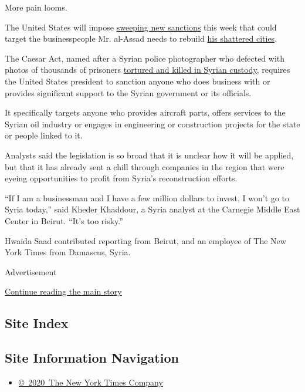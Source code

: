 More pain looms.

The United States will impose
\href{https://www.nytimes.com/2019/12/16/us/politics/us-syria-sanctions-war-crimes.html}{sweeping
new sanctions} this week that could target the businesspeople Mr.
al-Assad needs to rebuild
\href{https://www.nytimes.com/2019/08/20/world/middleeast/syria-recovery-aleppo-douma.html}{his
shattered cities}.

The Caesar Act, named after a Syrian police photographer who defected
with photos of thousands of prisoners
\href{https://www.nytimes.com/2019/05/11/world/middleeast/syria-torture-prisons.html}{tortured
and killed in Syrian custody}, requires the United States president to
sanction anyone who does business with or provides significant support
to the Syrian government or its officials.

It specifically targets anyone who provides aircraft parts, offers
services to the Syrian oil industry or engages in engineering or
construction projects for the state or people linked to it.

Analysts said the legislation is so broad that it is unclear how it will
be applied, but that it has already sent a chill through companies in
the region that were eyeing opportunities to profit from Syria's
reconstruction efforts.

``If I am a businessman and I have a few million dollars to invest, I
won't go to Syria today,'' said Kheder Khaddour, a Syria analyst at the
Carnegie Middle East Center in Beirut. ``It's too risky.''

Hwaida Saad contributed reporting from Beirut, and an employee of The
New York Times from Damascus, Syria.

Advertisement

\protect\hyperlink{after-bottom}{Continue reading the main story}

\hypertarget{site-index}{%
\subsection{Site Index}\label{site-index}}

\hypertarget{site-information-navigation}{%
\subsection{Site Information
Navigation}\label{site-information-navigation}}

\begin{itemize}
\tightlist
\item
  \href{https://help.nytimes.com/hc/en-us/articles/115014792127-Copyright-notice}{©~2020~The
  New York Times Company}
\end{itemize}

